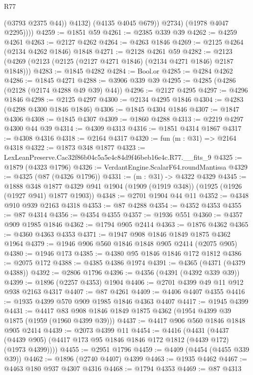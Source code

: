 \begin{lexlean}{R77}
\begin{coremodule}
                  (@3793 @2375 @44))
                @4132)
              (@4135 @4045 @679))
            @2734)
          (@1978 @4047 @2295))))
@4259 := @1851 @59
@4261 := @2385 @339 @39
@4262 := @4259 @4261
@4263 := @2127 @4262
@4264 := @4263 @1846
@4269 := @2125 @4264 (@2134 @4262 @1846) @1848
@4271 := @2128 @4261 @59
@4282 := @2123 (@4269 (@2123 (@2125 (@2127 @4271 @1846) (@2134 @4271 @1846) @2187 @1848)))
@4283 := @1845 @4282
@4284 := Bool.or
@4285 := @4284 @4262
@4286 := @1845 @4271
@4288 := @3906 @339 @39
@4295 := @4285 (@4286 (@2128 (@2174 @4288 @49 @39) @44))
@4296 := @2127 @4295
@4297 := @4296 @1846
@4298 := @2125 @4297
@4300 := @2134 @4295 @1846
@4304 := @4283 (@4298 @4300 @1846 @1846)
@4306 := @1845 @4304 @1846
@4307 := @1847 @4306
@4308 := @1845 @4307
@4309 := @1860 @4288
@4313 := @2219 @4297 @4300 @44 @39
@4314 := @4309 @4313
@4316 := @1851 @4314 @1867
@4317 := @4308 @4316
@4318 := @2164 @4317
@4320 := fun (m : @31) => @2164 @4318
@4322 := @1873 @348 @1877
@4323 := LexLeanPreserve.Cac32f86b04c5a5e4c84d9f46beb16e4c.R77.__fits_9
@4325 := @1879 (@4323 @1796)
@4326 := VerdantEngine.ScalarF64.roundMantissa
@4329 := @4325 (@87 (@4326 @1796))
@4331 := (m : @31) -> @4322 @4329
@4345 := @1888
    @348
    @1877
    @4329
    @941
    @1904
    (@1909 (@1919 @348))
    (@1925 (@1926 (@1927 @941) @1877 @1903))
@4348 := @2701 @1904 @44 @11
@4352 := @4348 @910 @939 @2163 @4318
@4353 := @87 @4288
@4354 := @4352 @4353
@4355 := @87 @4314
@4356 := @4354 @4355
@4357 := @1936 @551
@4360 := @4357 @909 @1985 @1846
@4362 := @1794 @905 @2414
@4363 := @1876 @4362
@4365 := @4360 @4363 @4353
@4371 := @1947 @908 @1846 @1849 @1875 @4362 @1964
@4379 := @1946 @906 @560 @1846 @1848 @905 @2414 (@2075 @905)
@4380 := @1946 @173
@4385 := @4380 @95 @1846 @1846 @172 @1812
@4386 := @2075 @172
@4388 := @4385 @4386 @1974
@4391 := @4365 (@4371 (@4379 @4388))
@4392 := @2806 @1796
@4396 := @4356 (@4391 (@4392 @339 @39))
@4399 := @1896 (@2257 @4353) @1904
@4406 := @2701 @4399 @49 @11 @912 @938 @2163 @4317
@4407 := @87 @4261
@4409 := @4406 @4407 @4355
@4416 := @1935 @4399 @570 @909 @1985 @1846 @4363 @4407
@4417 := @1945 @4399
@4431 := @4417 @83 @908 @1846 @1849 @1875 @4362 (@1954 @4399 @39 @1875 (@1959 (@1960 @4399 @39)))
@4437 := @4417 @906 @560 @1846 @1848 @905 @2414
@4439 := @2073 @4399 @11
@4454 := @4416
    (@4431 (@4437 (@4439 @905) (@4417 @173 @95 @1846 @1846 @172 @1812 (@4439 @172) (@1973 @4399))))
@4455 := @2951 @1796
@4459 := @4409 (@4454 (@4455 @339 @39))
@4462 := @1896 (@2740 @4407) @4399
@4463 := @1935 @4462
@4467 := @4463 @180 @937 @4307 @4316
@4468 := @1794 @4353
@4469 := @87 @4313

\end{coremodule}
\end{lexlean}
